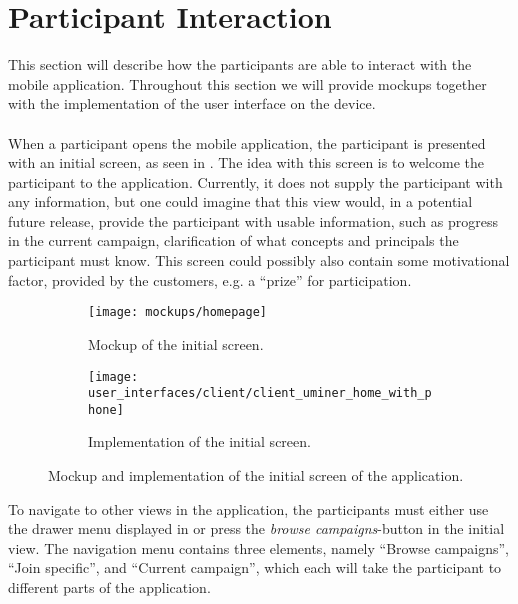 
\section{Participant Interaction}
\label{sec:participant_interaction}
This section will describe how the participants are able to interact with the mobile application. Throughout this section we will provide mockups together with the implementation of the user interface on the device. 
\\\\
When a participant opens the mobile application, the participant is presented with an initial screen, as seen in . The idea with this screen is to welcome the participant to the application. Currently, it does not supply the participant with any information, but one could imagine that this view would, in a potential future release, provide the participant with usable information, such as progress in the current campaign, clarification of what concepts and principals the participant must know. This screen could possibly also contain some motivational factor, provided by the customers, e.g. a ``prize'' for participation.

\begin{figure}[!htbp]
    \begin{subfigure}[!t]{.48\textwidth}
        \centering
        \texttt{[image: mockups/homepage]}
        \caption{Mockup of the initial screen.}
        \label{fig:mockup_initial_screen}
    \end{subfigure}%
    \begin{subfigure}[!t]{.52\textwidth}
    \centering
        \texttt{[image: user\_interfaces/client/client\_uminer\_home\_with\_phone]}
        \caption{Implementation of the initial screen.}
        \label{fig:implementation_initial_screen}
    \end{subfigure}
    \caption{Mockup and implementation of the initial screen of the application.}
    \label{fig:initial_screen}
\end{figure}
\FloatBarrier

To navigate to other views in the application, the participants must either use the drawer menu displayed in  or press the \emph{browse campaigns}-button in the initial view. The navigation menu contains three elements, namely ``Browse campaigns'', ``Join specific'', and ``Current campaign'', which each will take the participant to different parts of the application.


